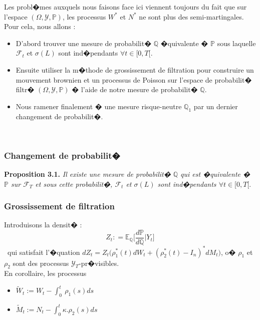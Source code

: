 \documentclass[11pt,letterpaper]{article}
\makeatletter
\newcommand{\mathcenter}{\@fleqnfalse}
\makeatother
\begin{document}
Les probl�mes auxquels nous faisons face ici viennent toujours du fait que sur l'espace $(\Omega, \mathcal{Y}, \mathbb{P})$, les processus $W^*$ et $N^*$ ne sont plus des semi-martingales. Pour cela, nous allons : \\
\begin{itemize}
\item D'abord trouver une mesure de probabilit� $\mathbb{Q}$ �quivalente � $\mathbb{P}$ sous laquelle $\mathcal{F}_t$ et $\sigma(L)$ sont ind�pendants $\forall t \in [0, T[$.\
\item Ensuite utiliser la m�thode de grossissement de filtration pour construire un mouvement brownien et un processus de Poisson sur l'espace de probabilit� filtr� $(\Omega, \mathcal{Y}, \mathbb{P})$ � l'aide de notre mesure de probabilit� $\mathbb{Q}$.
\item Nous ramener finalement � une mesure risque-neutre $\mathbb{Q}_1$ par un dernier changement de probabilit�. 
\end{itemize}
\

\subsubsection{Changement de probabilit�}
\textbf{Proposition 3.1.} \textit{Il existe une mesure de probabilit� $\mathbb{Q}$ qui est �quivalente � $\mathbb{P}$ sur $\mathcal{F}_T$ et sous cette probabilit�, $\mathcal{F}_t$ et $\sigma(L)$ sont ind�pendants $\forall t \in [0, T[$}.\\

\subsubsection{Grossissement de filtration}
Introduisons la densit� : 
\mathcenter
\begin{equation*}
\displaystyle Z_t : = \mathbb{E}_{\mathbb{Q}}\Big[\frac{d\mathbb{P}}{d\mathbb{Q}}|Y_t\Big]
\end{equation*}
\
qui satisfait l'�quation $\displaystyle dZ_t = Z_t\Big(\rho^*_1 (t) dW_t + (\rho^*_2 (t) - I_n)^* dM_t\Big)$, o� $\rho_1$ et $\rho_2$ sont des processus $\mathcal{Y}_T$-pr�visibles.\\

En corollaire, les processus \\

\begin{itemize}
\item $\displaystyle \widetilde{W}_t := W_t - \int_{0}^{t}\ \rho_1(s) ds$\
\item $\displaystyle \widetilde{M}_t := N_t - \int_{0}^{t}\kappa.\rho_2 (s) ds$
\end{itemize}
\ 
\end{document}
